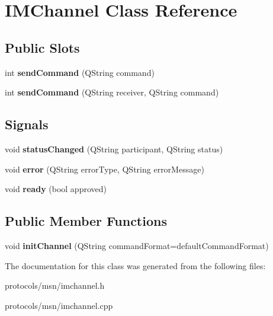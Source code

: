 \hypertarget{classIMChannel}{
\section{IMChannel Class Reference}
\label{classIMChannel}
}
\subsection*{Public Slots}
\begin{DoxyCompactItemize}
\item 
\hypertarget{classIMChannel_a72b1406ad7f4a201227571aacc7c08a5}{
int {\bfseries sendCommand} (QString command)}
\label{classIMChannel_a72b1406ad7f4a201227571aacc7c08a5}

\item 
\hypertarget{classIMChannel_a80baef2b867056f3c5cf8bb77a48fbde}{
int {\bfseries sendCommand} (QString receiver, QString command)}
\label{classIMChannel_a80baef2b867056f3c5cf8bb77a48fbde}

\end{DoxyCompactItemize}
\subsection*{Signals}
\begin{DoxyCompactItemize}
\item 
\hypertarget{classIMChannel_a531782fdd5f721431795ec28d1a28342}{
void {\bfseries statusChanged} (QString participant, QString status)}
\label{classIMChannel_a531782fdd5f721431795ec28d1a28342}

\item 
\hypertarget{classIMChannel_a36b88977bbe65fea6e92269fb5c88742}{
void {\bfseries error} (QString errorType, QString errorMessage)}
\label{classIMChannel_a36b88977bbe65fea6e92269fb5c88742}

\item 
\hypertarget{classIMChannel_a46a6616042149cda70ca6dc5f021e0d5}{
void {\bfseries ready} (bool approved)}
\label{classIMChannel_a46a6616042149cda70ca6dc5f021e0d5}

\end{DoxyCompactItemize}
\subsection*{Public Member Functions}
\begin{DoxyCompactItemize}
\item 
\hypertarget{classIMChannel_afe6d4a5f88d55d1fbccb2dcaf33476a5}{
void {\bfseries initChannel} (QString commandFormat=defaultCommandFormat)}
\label{classIMChannel_afe6d4a5f88d55d1fbccb2dcaf33476a5}

\end{DoxyCompactItemize}


The documentation for this class was generated from the following files:\begin{DoxyCompactItemize}
\item 
protocols/msn/imchannel.h\item 
protocols/msn/imchannel.cpp\end{DoxyCompactItemize}
